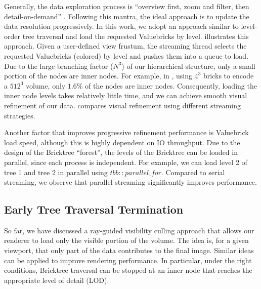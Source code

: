 Generally, the data exploration process is ``overview first, zoom and filter, then detail-on-demand''
\cite{ferster2012interactive,wang2018association}. 
Following this mantra, 
the ideal approach is to update the data resolution progressively. 
In this work, we adopt an approach similar
to level-order tree traversal and load the requested Valuebricks by level. 
illustrates this approach. Given a user-defined view frustum, the streaming thread
selects the requested Valuebricks (colored) by level and pushes them into a queue to load. Due to
the large branching factor ($N^3$) of our hierarchical structure, only a small portion of the
nodes are inner nodes. For example, in , using $4^3$ bricks to encode a
$512^3$ volume, only $1.6\%$ of the nodes are inner nodes. Consequently, loading the inner node levels
takes relatively little time, and we can achieve smooth visual refinement of our data. 
 compares visual refinement using different streaming strategies.




Another factor that improves progressive refinement performance is Valuebrick load speed,
although this is highly dependent on IO throughput. Due to the design of the Bricktree ``forest'', 
the levels of the Bricktree can be loaded in parallel, since each process is independent.
For example, we can load level 2 of tree 1 and tree 2 in parallel using $tbb::parallel\_for$. 
Compared to serial streaming, we observe that parallel streaming significantly improves performance. 


\subsection{Early Tree Traversal Termination}
So far, we have discussed a ray-guided visibility culling approach that allows our renderer
to load only the visible portion of the volume. The idea is, for a given viewport, that only part of the data
contributes to the final image. Similar ideas can be applied to improve 
rendering performance. In particular, under the right conditions, Bricktree traversal
can be stopped at an inner node that reaches the appropriate level of detail (LOD). 

